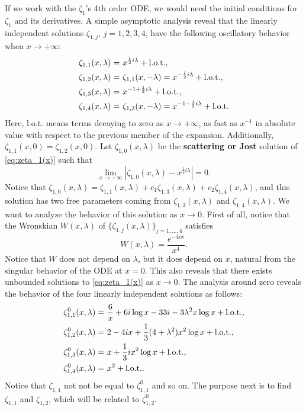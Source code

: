 \documentclass[%
 aip,
 jmp,%
 amsmath,amssymb,
 reprint,%
]{revtex4-2}
\begin{document}
If we work with the $\zeta_1$'s 4th order ODE, we would need the initial conditions for $\zeta_1$ and its derivatives. A simple asymptotic analysis reveal that the linearly independent solutions $\zeta_{1,j}$, $j=1,2,3,4$,  have the following oscillatory behavior when $x\to +\infty$:
\[
\begin{aligned}
\zeta_{1,1}(x,\lambda) =&~{} x^{ \frac12 i \lambda}+ \hbox{l.o.t.},\\
\zeta_{1,2}(x,\lambda) =&~{} \zeta_{1,1}(x,-\lambda) = x^{- \frac12 i \lambda}+ \hbox{l.o.t.},\\
\zeta_{1,3}(x,\lambda) =&~{} x^{-1+ \frac12 i \lambda}+ \hbox{l.o.t.},\\
\zeta_{1,4}(x,\lambda) =&~{} \zeta_{1,3}(x,-\lambda) =x^{-1- \frac12 i \lambda}+ \hbox{l.o.t.}
\end{aligned}
\]
Here, l.o.t. means terms decaying to zero as $x\to +\infty$, as fast as $x^{-1}$ in absolute value with respect to the previous member of the expansion. Additionally, $\zeta_{1,1}(x,0)=\zeta_{1,2}(x,0)$. Let $\zeta_{1,0}(x,\lambda)$ be the {\bf scattering or Jost} solution of \eqref{eq:zeta_1(x)} such that 
\[
\lim_{x\to +\infty} |\zeta_{1,0}(x,\lambda) - x^{ \frac12 i \lambda} | =0.
\]
Notice that $\zeta_{1,0}(x,\lambda) = \zeta_{1,1}(x,\lambda) + c_1 \zeta_{1,3}(x,\lambda) +c_2 \zeta_{1,4}(x,\lambda)$, and this solution has two free parameters coming from $\zeta_{1,3}(x,\lambda)$ and $\zeta_{1,4}(x,\lambda) $. We want to analyze the behavior of this solution as $x\to 0$. First of all, notice that the Wronskian $W(x,\lambda)$ of $\{\zeta_{1,j}(x,\lambda)\}_{j=1,\ldots,4}$ satisfies
\[
W(x,\lambda) = \frac{e^{-4ix}}{x^4}.
\]
Notice that $W$ does not depend on $\lambda$, but it does depend on $x$, natural from the singular behavior of the ODE at $x=0$. This also reveals that there exists unbounded solutions to \eqref{eq:zeta_1(x)} as $x\to 0$. The analysis around zero reveals the behavior of the four linearly independent solutions as follows:
\[
\begin{aligned}
\zeta_{1,1}^0(x,\lambda) =&~{} \frac6x + 6i \log x -33i -3\lambda^2 x\log x+ \hbox{l.o.t.},\\
\zeta_{1,2}^0(x,\lambda) =&~{} 2-4ix +\frac13 (4+\lambda^2) x^2 \log x+ \hbox{l.o.t.},\\
\zeta_{1,3}^0(x,\lambda) =&~{} x +\frac13ix^2\log x + \hbox{l.o.t.},\\
\zeta_{1,4}^0(x,\lambda) =&~{} x^2 + \hbox{l.o.t.}.
\end{aligned}
\]
Notice that $\zeta_{1,1}$ not not be equal to $\zeta_{1,1}^0$ and so on. The purpose next is to find $\zeta_{1,1}$ and $\zeta_{1,2}$, which will be related to $\zeta_{1,2}^0$.
\end{document}
